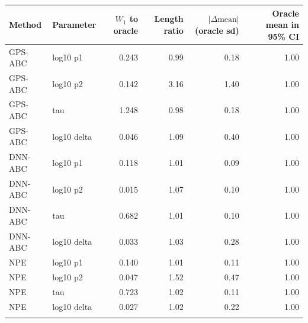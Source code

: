 \begin{tabular}{llrrrr}
\toprule
Method & Parameter & $W_1$ to oracle & Length ratio & $|\Delta\text{mean}|$ (oracle sd) & Oracle mean in 95\% CI \\
\midrule
GPS-ABC & log10 p1 & 0.243 & 0.99 & 0.18 & 1.00 \\
GPS-ABC & log10 p2 & 0.142 & 3.16 & 1.40 & 1.00 \\
GPS-ABC & tau & 1.248 & 0.98 & 0.18 & 1.00 \\
GPS-ABC & log10 delta & 0.046 & 1.09 & 0.40 & 1.00 \\
\addlinespace
DNN-ABC & log10 p1 & 0.118 & 1.01 & 0.09 & 1.00 \\
DNN-ABC & log10 p2 & 0.015 & 1.07 & 0.10 & 1.00 \\
DNN-ABC & tau & 0.682 & 1.01 & 0.10 & 1.00 \\
DNN-ABC & log10 delta & 0.033 & 1.03 & 0.28 & 1.00 \\
\addlinespace
NPE & log10 p1 & 0.140 & 1.01 & 0.11 & 1.00 \\
NPE & log10 p2 & 0.047 & 1.52 & 0.47 & 1.00 \\
NPE & tau & 0.723 & 1.02 & 0.11 & 1.00 \\
NPE & log10 delta & 0.027 & 1.02 & 0.22 & 1.00 \\
\addlinespace
\bottomrule
\end{tabular}
